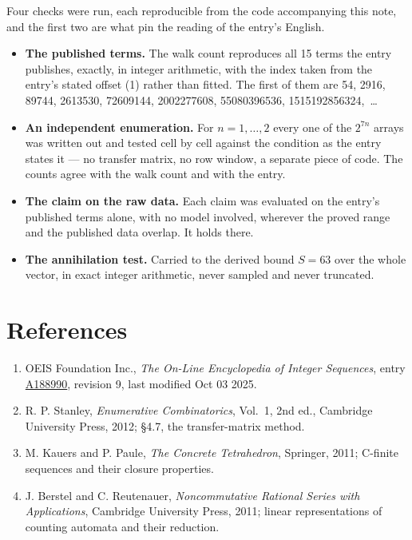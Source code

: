 \documentclass[11pt]{article}
\theoremstyle{definition}
\begin{document}
Four checks were run, each reproducible from the code accompanying this note, and the first two are what pin the reading of the entry's English.

\begin{itemize}

\item {\bfseries The published terms.} The walk count reproduces all 15 terms the entry publishes, exactly, in integer arithmetic, with the index taken from the entry's stated offset (1) rather than fitted. The first of them are 54, 2916, 89744, 2613530, 72609144, 2002277608, 55080396536, 1515192856324,~\dots

\item {\bfseries An independent enumeration.} For $n = 1,\dots,2$ every one of the $2^{7n}$ arrays was written out and tested cell by cell against the condition as the entry states it --- no transfer matrix, no row window, a separate piece of code. The counts agree with the walk count and with the entry.

\item {\bfseries The claim on the raw data.} Each claim was evaluated on the entry's published terms alone, with no model involved, wherever the proved range and the published data overlap. It holds there.

\item {\bfseries The annihilation test.} Carried to the derived bound $S = 63$ over the whole vector, in exact integer arithmetic, never sampled and never truncated.

\end{itemize}

\section{References}

\begin{enumerate}

\item OEIS Foundation Inc., \emph{The On-Line Encyclopedia of Integer Sequences}, entry \href{https://oeis.org/A188990}{A188990}, revision 9, last modified Oct 03 2025.

\item R. P. Stanley, \emph{Enumerative Combinatorics}, Vol.~1, 2nd ed., Cambridge University Press, 2012; \S4.7, the transfer-matrix method.

\item M. Kauers and P. Paule, \emph{The Concrete Tetrahedron}, Springer, 2011; C-finite sequences and their closure properties.

\item J. Berstel and C. Reutenauer, \emph{Noncommutative Rational Series with Applications}, Cambridge University Press, 2011; linear representations of counting automata and their reduction.

\end{enumerate}
\end{document}
